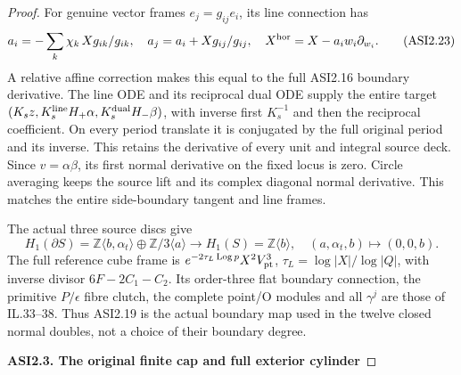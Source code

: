 \begin{proof}
For genuine vector frames \(e_j=g_{ij}e_i\), its line
connection has
\[
 a_i=-\sum_k\chi_k\,Xg_{ik}/g_{ik},\quad
 a_j=a_i+Xg_{ij}/g_{ij},\quad
              X^{\rm hor}=X-a_iw_i\partial_{w_i}.
 \tag{ASI2.23}
\]
A relative affine correction makes this equal to the
full ASI2.16 boundary derivative. The line ODE and
its reciprocal dual ODE supply the entire target
\((K_sz,K_s^{\rm line}H_+\alpha,
K_s^{\rm dual}H_-\beta)\), with inverse first
\(K_s^{-1}\) and then the reciprocal coefficient.
On every period translate it is conjugated by the
full original period and its inverse. This retains
the derivative of every unit and integral source
deck. Since \(v=\alpha\beta\), its first normal
derivative on the fixed locus is zero. Circle
averaging keeps the source lift and its complex
diagonal normal derivative. This matches the entire
side-boundary tangent and line frames.

The actual three source discs give
\[
 H_1(\partial S)=\mathbb Z\langle b,\alpha_t\rangle
                 \oplus\mathbb Z/3\langle a\rangle
       \longrightarrow H_1(S)=\mathbb Z\langle b\rangle,
 \quad (a,\alpha_t,b)\mapsto(0,0,b).
 \tag{ASI2.24}
\]
The full reference cube frame is
\(e^{-2\tau_L\operatorname{Log}p}X^2V_{\rm pt}^3\),
\(\tau_L=\log|X|/\log|Q|\), with inverse divisor
\(6F-2C_1-C_2\). Its order-three flat boundary connection,
the primitive \(P/\epsilon\) fibre clutch, the complete
point/O modules and all \(\gamma^j\) are those of IL.33--38.
Thus ASI2.19 is the actual boundary map used in the
twelve closed normal doubles, not a choice of their
boundary degree.

\par

\medskip\noindent\textbf{ASI2.3. The original finite cap and full exterior cylinder}

\par\nobreak


\end{proof}
